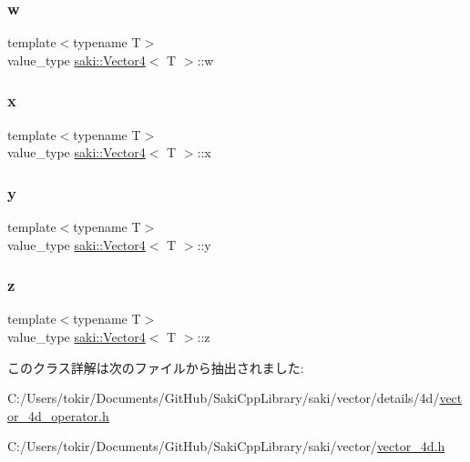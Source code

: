 \subsubsection{\texorpdfstring{w}{w}}
{\footnotesize\ttfamily template$<$typename T$>$ \\
value\+\_\+type \mbox{\hyperlink{classsaki_1_1_vector4}{saki\+::\+Vector4}}$<$ T $>$\+::w}

\mbox{\label{classsaki_1_1_vector4_a07c6a4beecbc0baa5ca27be031290c04}} 
\subsubsection{\texorpdfstring{x}{x}}
{\footnotesize\ttfamily template$<$typename T$>$ \\
value\+\_\+type \mbox{\hyperlink{classsaki_1_1_vector4}{saki\+::\+Vector4}}$<$ T $>$\+::x}

\mbox{\label{classsaki_1_1_vector4_ad0b51a883b9d9e620598f3c2396db62f}} 
\subsubsection{\texorpdfstring{y}{y}}
{\footnotesize\ttfamily template$<$typename T$>$ \\
value\+\_\+type \mbox{\hyperlink{classsaki_1_1_vector4}{saki\+::\+Vector4}}$<$ T $>$\+::y}

\mbox{\label{classsaki_1_1_vector4_a0d2525927f1a8c931b7596e258da1e9a}} 
\subsubsection{\texorpdfstring{z}{z}}
{\footnotesize\ttfamily template$<$typename T$>$ \\
value\+\_\+type \mbox{\hyperlink{classsaki_1_1_vector4}{saki\+::\+Vector4}}$<$ T $>$\+::z}



このクラス詳解は次のファイルから抽出されました\+:\begin{DoxyCompactItemize}
\item 
C\+:/\+Users/tokir/\+Documents/\+Git\+Hub/\+Saki\+Cpp\+Library/saki/vector/details/4d/\mbox{\hyperlink{vector__4d__operator_8h}{vector\+\_\+4d\+\_\+operator.\+h}}\item 
C\+:/\+Users/tokir/\+Documents/\+Git\+Hub/\+Saki\+Cpp\+Library/saki/vector/\mbox{\hyperlink{vector__4d_8h}{vector\+\_\+4d.\+h}}\end{DoxyCompactItemize}
